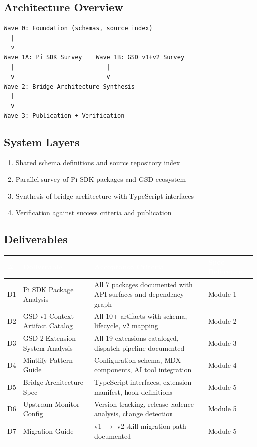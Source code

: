 \documentclass[11pt,letterpaper]{article}
\newcommand{\tableheader}[1]{\textbf{\sffamily\textcolor{white}{#1}}}
\begin{document}
\subsection{Architecture Overview}

\begin{asciibox}
\begin{verbatim}
Wave 0: Foundation (schemas, source index)
  |
  v
Wave 1A: Pi SDK Survey    Wave 1B: GSD v1+v2 Survey
  |                          |
  v                          v
Wave 2: Bridge Architecture Synthesis
  |
  v
Wave 3: Publication + Verification
\end{verbatim}
\end{asciibox}

\subsection{System Layers}

\begin{enumerate}[leftmargin=2em]
\item Shared schema definitions and source repository index
\item Parallel survey of Pi SDK packages and GSD ecosystem
\item Synthesis of bridge architecture with TypeScript interfaces
\item Verification against success criteria and publication
\end{enumerate}

\subsection{Deliverables}

\begin{center}
\begin{tabularx}{\textwidth}{C{0.6cm}L{4cm}XL{2.5cm}}
\toprule
{}
\tableheader{\#} & \tableheader{Deliverable} & \tableheader{Acceptance Criteria} & \tableheader{Spec Reference} \\
\midrule
D1 & Pi SDK Package Analysis & All 7 packages documented with API surfaces and dependency graph & Module 1 \\
D2 & GSD v1 Context Artifact Catalog & All 10+ artifacts with schema, lifecycle, v2 mapping & Module 2 \\
D3 & GSD-2 Extension System Analysis & All 19 extensions cataloged, dispatch pipeline documented & Module 3 \\
D4 & Mintlify Pattern Guide & Configuration schema, MDX components, AI tool integration & Module 4 \\
D5 & Bridge Architecture Spec & TypeScript interfaces, extension manifest, hook definitions & Module 5 \\
D6 & Upstream Monitor Config & Version tracking, release cadence analysis, change detection & Module 5 \\
D7 & Migration Guide & v1 $\rightarrow$ v2 skill migration path documented & Module 5 \\
\bottomrule
\end{tabularx}
\end{center}
\end{document}
